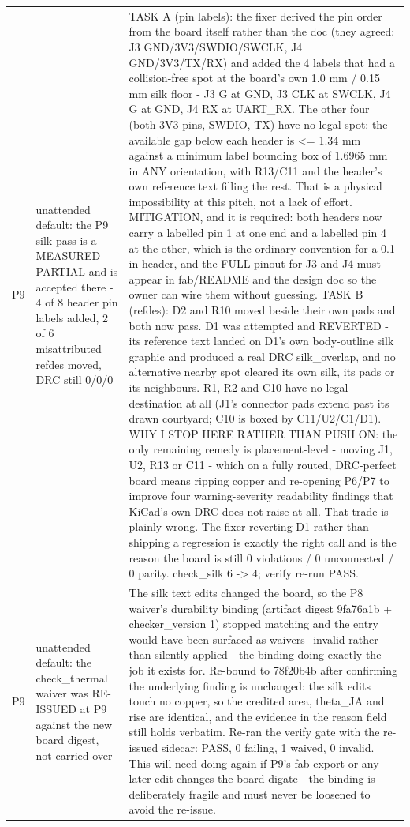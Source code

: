 \documentclass[11pt,a4paper]{article}
\begin{document}
{\begin{longtable}{lp{5.2cm}p{7.2cm}}
P9 & unattended default: the P9 silk pass is a MEASURED PARTIAL and is accepted there - 4 of 8 header pin labels added, 2 of 6 misattributed refdes moved, DRC still 0/0/0 & TASK A (pin labels): the fixer derived the pin order from the board itself rather than the doc (they agreed: J3 GND/3V3/SWDIO/SWCLK, J4 GND/3V3/TX/RX) and added the 4 labels that had a collision-free spot at the board's own 1.0 mm / 0.15 mm silk floor - J3 G at GND, J3 CLK at SWCLK, J4 G at GND, J4 RX at UART\_RX. The other four (both 3V3 pins, SWDIO, TX) have no legal spot: the available gap below each header is \textless{}= 1.34 mm against a minimum label bounding box of 1.6965 mm in ANY orientation, with R13/C11 and the header's own reference text filling the rest. That is a physical impossibility at this pitch, not a lack of effort. MITIGATION, and it is required: both headers now carry a labelled pin 1 at one end and a labelled pin 4 at the other, which is the ordinary convention for a 0.1 in header, and the FULL pinout for J3 and J4 must appear in fab/README and the design doc so the owner can wire them without guessing. TASK B (refdes): D2 and R10 moved beside their own pads and both now pass. D1 was attempted and REVERTED - its reference text landed on D1's own body-outline silk graphic and produced a real DRC silk\_overlap, and no alternative nearby spot cleared its own silk, its pads or its neighbours. R1, R2 and C10 have no legal destination at all (J1's connector pads extend past its drawn courtyard; C10 is boxed by C11/U2/C1/D1). WHY I STOP HERE RATHER THAN PUSH ON: the only remaining remedy is placement-level - moving J1, U2, R13 or C11 - which on a fully routed, DRC-perfect board means ripping copper and re-opening P6/P7 to improve four warning-severity readability findings that KiCad's own DRC does not raise at all. That trade is plainly wrong. The fixer reverting D1 rather than shipping a regression is exactly the right call and is the reason the board is still 0 violations / 0 unconnected / 0 parity. check\_silk 6 -\textgreater{} 4; verify re-run PASS. \\
P9 & unattended default: the check\_thermal waiver was RE-ISSUED at P9 against the new board digest, not carried over & The silk text edits changed the board, so the P8 waiver's durability binding (artifact digest 9fa76a1b + checker\_version 1) stopped matching and the entry would have been surfaced as waivers\_invalid rather than silently applied - the binding doing exactly the job it exists for. Re-bound to 78f20b4b after confirming the underlying finding is unchanged: the silk edits touch no copper, so the credited area, theta\_JA and rise are identical, and the evidence in the reason field still holds verbatim. Re-ran the verify gate with the re-issued sidecar: PASS, 0 failing, 1 waived, 0 invalid. This will need doing again if P9's fab export or any later edit changes the board digate - the binding is deliberately fragile and must never be loosened to avoid the re-issue. \\

\end{longtable}}
\end{document}
